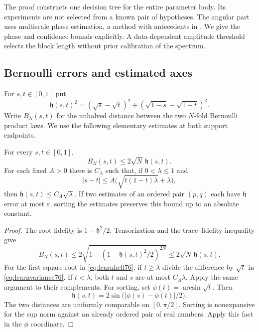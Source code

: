 The proof constructs one decision tree for the entire parameter body.
Its experiments are not selected from a known pair of hypotheses.
The angular part uses multiscale phase estimation, a method with
antecedents in \cite{HB76,KLY76}.  We give the phase and confidence
bounds explicitly.  A data-dependent amplitude threshold selects the
block length without prior calibration of the spectrum.

\subsection{Bernoulli errors and estimated axes}

For $s,t\in[0,1]$ put
\begin{equation}\label{eq:learnhell76}
 \mathfrak h(s,t)^2=(\sqrt s-\sqrt t)^2
                     +(\sqrt{1-s}-\sqrt{1-t})^2.
\end{equation}
Write $B_N(s,t)$ for the unhalved distance between the two
$N$-fold Bernoulli product laws.
We use the following elementary estimates at both support endpoints.

\begin{lemma}
\label{lem:learnendpoint76}
For every $s,t\in[0,1]$,
\begin{equation}\label{eq:learnproduct76}
 B_N(s,t)\le2\sqrt N\,\mathfrak h(s,t).
\end{equation}
For each fixed $A>0$ there is $C_A$ such that, if $0<\lambda\le1$ and
\begin{equation}\label{eq:learnvariance76}
 |s-t|\le A\bigl(\sqrt{t(1-t)\lambda}+\lambda\bigr),
\end{equation}
then $\mathfrak h(s,t)\le C_A\sqrt\lambda$.
If two estimates of an ordered pair $(p,q)$ each have
$\mathfrak h$ error at most $\varepsilon$, sorting the estimates
preserves this bound up to an absolute constant.
\end{lemma}
\begin{proof}
The root fidelity is $1-\mathfrak h^2/2$.  Tensorization and the
trace--fidelity inequality give
\[
 B_N(s,t)\le
 2\sqrt{1-(1-\mathfrak h(s,t)^2/2)^{2N}}
 \le2\sqrt N\,\mathfrak h(s,t).
\]
For the first square root in \eqref{eq:learnhell76}, if $t\ge\lambda$
divide the difference by $\sqrt t$ in
\eqref{eq:learnvariance76}.  If $t<\lambda$, both $t$ and $s$ are
at most $C_A\lambda$.  Apply the same argument to their complements.
For sorting, set $\phi(t)=\arcsin\sqrt t$.  Then
\[
 \mathfrak h(s,t)=2\sin\bigl(|\phi(s)-\phi(t)|/2\bigr).
\]
The two distances are uniformly comparable on $[0,\pi/2]$.
Sorting is nonexpansive for the sup norm against an already ordered
pair of real numbers.  Apply this fact in the $\phi$ coordinate.
\end{proof}


